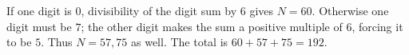 If one digit is $0$, divisibility of the digit sum by $6$ gives $N=60$. Otherwise one digit must be $7$; the other digit makes the sum a positive multiple of $6$, forcing it to be $5$. Thus $N=57,75$ as well. The total is $60+57+75=\boxed{192}$.

